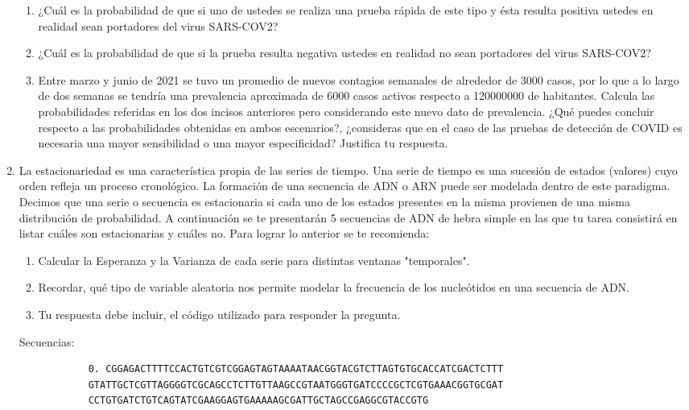 \documentclass[letter]{article}
\begin{document}
\begin{enumerate}
        	\begin{enumerate}
        		\item ¿Cuál es la probabilidad de que si uno de ustedes se realiza
                    una prueba rápida de este tipo y ésta resulta positiva ustedes en 
                    realidad sean portadores del virus SARS-COV2?
                \item ¿Cuál es la probabilidad de que si la prueba resulta negativa
        			ustedes en realidad no sean portadores del virus SARS-COV2?
        		\item Entre marzo y junio de 2021 se tuvo un promedio de nuevos contagios
                    semanales de alrededor de 3000 casos, por lo que a lo largo de dos 
                    semanas se tendría una prevalencia aproximada de 6000 casos activos respecto
                    a 120000000 de habitantes. Calcula las probabilidades referidas en los 
                    dos incisos anteriores pero considerando este nuevo dato de prevalencia. 
                    ¿Qué puedes concluir respecto a las probabilidades obtenidas en ambos escenarios?, 
                    ¿consideras que en el caso de las pruebas de detección de COVID es necesaria 
                    una mayor sensibilidad o una mayor especificidad? Justifica tu respuesta.
              \end{enumerate}
        \item La estacionariedad es una característica propia de las series de tiempo. Una serie
        de tiempo es una sucesión de estados (valores) cuyo orden refleja un proceso cronológico. 
        La formación de una secuencia de ADN o ARN puede ser modelada dentro de este paradigma.
        Decimos que una serie o secuencia es estacionaria si cada uno de los estados presentes 
        en la misma provienen de una misma distribución de probabilidad. A continuación se te 
        presentarán 5 secuencias de ADN de hebra simple en las que tu tarea consistirá en listar 
        cuáles son estacionarias y cuáles no. Para lograr lo anterior se te recomienda:
        \begin{enumerate}
            \item Calcular la Esperanza y la Varianza de cada serie para distintas ventanas 
            "temporales".
            \item Recordar, qué tipo de variable aleatoria nos permite modelar la frecuencia de 
            los nucleótidos en una secuencia de ADN.
            \item Tu respuesta debe incluir, el código utilizado para responder la pregunta.
        \end{enumerate}   
        Secuencias:
        \begin{verbatim}
            0. CGGAGACTTTTCCACTGTCGTCGGAGTAGTAAAATAACGGTACGTCTTAGTGTGCACCATCGACTCTTT
            GTATTGCTCGTTAGGGGTCGCAGCCTCTTGTTAAGCCGTAATGGGTGATCCCCGCTCGTGAAACGGTGCGAT
            CCTGTGATCTGTCAGTATCGAAGGAGTGAAAAAGCGATTGCTAGCCGAGGCGTACCGTG
            

\end{verbatim}
\end{enumerate}
\end{document}
